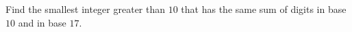 Find the smallest integer greater than $10$ that has the same sum of digits in base $10$ and in base $17$.
